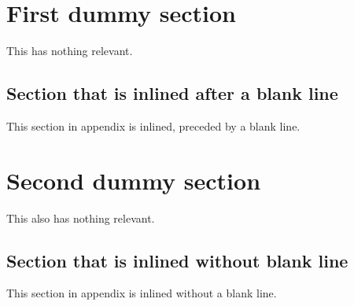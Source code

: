 \documentclass{article}
\begin{document}
\section{First dummy section}
This has nothing relevant.

\begin{toappendix}

\section{Section that is inlined after a blank line}
This section in appendix is inlined, preceded by a blank line.
\end{toappendix}

\section{Second dummy section}
This also has nothing relevant.

\begin{toappendix}
\section{Section that is inlined without blank line}
This section in appendix is inlined without a blank line.
\end{toappendix}
\end{document}
